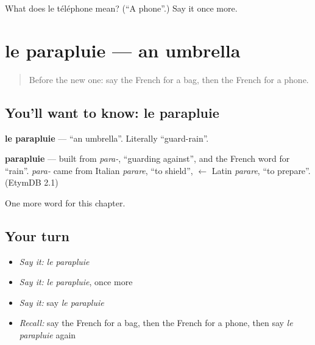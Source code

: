 \begin{tcolorbox}[breakable,colback=teal!4,colframe=teal!35!black,title={Before you move on}]
What does le téléphone mean? (\textquotedblleft{}A phone\textquotedblright{}.) Say it once more.
\end{tcolorbox}
\section[le parapluie]{le parapluie — an umbrella}

\label{lesson:FR-C79-parapluie}



\begin{quote}
Before the new one: say the French for a bag, then the French for a phone.
\end{quote}

\subsection*{You'll want to know: le parapluie}
\textbf{le parapluie} — \textquotedblleft{}an umbrella\textquotedblright{}. Literally \textquotedblleft{}guard-rain\textquotedblright{}.

\begin{cousinweb}
\textbf{parapluie} — built from \emph{para-}, \textquotedblleft{}guarding against\textquotedblright{}, and the French word for \textquotedblleft{}rain\textquotedblright{}. \emph{para-} came from Italian \emph{parare}, \textquotedblleft{}to shield\textquotedblright{}, $\leftarrow$ Latin \emph{parare}, \textquotedblleft{}to prepare\textquotedblright{}. (EtymDB 2.1)
\end{cousinweb}

\begin{grammarlens}[title={What you've built}]
One more word for this chapter.
\end{grammarlens}

\subsection*{Your turn}
\begin{itemize}
\raggedright
  \item \emph{Say it:} \emph{le parapluie}
  \item \emph{Say it:} \emph{le parapluie}, once more
  \item \emph{Say it:} say \emph{le parapluie}
  \item \emph{Recall:} say the French for a bag, then the French for a phone, then say \emph{le parapluie} again
\end{itemize}

